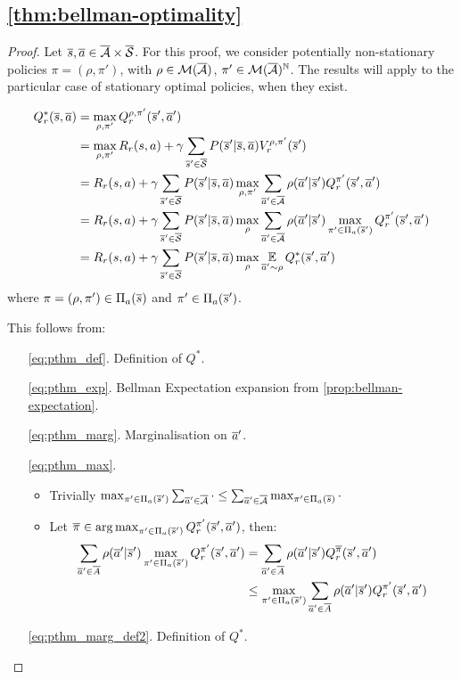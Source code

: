 \subsection{\autoref{thm:bellman-optimality}}

\begin{proof}
Let $\overline{s}, \overline{a} \in \overline{\mathcal{A}}\times\overline{\mathcal{S}}$. For this proof, we consider  potentially non-stationary policies $\pi=(\rho, \pi')$, with $\rho\in\mathcal{M}(\overline{\mathcal{A}})$, $\pi'\in\mathcal{M}(\overline{\mathcal{A}})^{\mathbb{N}}$. The results will apply to the particular case of stationary optimal policies, when they exist.

\begin{align}
    Q_r^*(\overline{s}, \overline{a}) &=  \max_{\rho, \pi'} Q_r^{\rho, \pi'}(\overline{s}', \overline{a}') \label{eq:pthm_def}\\
    &= \max_{\rho, \pi'} R_r(s, a) + \gamma \sum_{\overline{s}'\in\overline{\mathcal{S}}} P(\overline{s}' | \overline{s}, \overline{a}) V_r^{\rho, \pi'}(\overline{s}') \label{eq:pthm_exp}\\
    &= R_r(s, a) + \gamma \sum_{\overline{s}'\in\overline{\mathcal{S}}}  P(\overline{s}' | \overline{s}, \overline{a}) \max_{\rho, \pi'} \sum_{\overline{a}'\in\overline{\mathcal{A}}} \rho(\overline{a}' | \overline{s}')Q_r^{\pi'}(\overline{s}', \overline{a}') \label{eq:pthm_marg}\\
    &= R_r(s, a) + \gamma \sum_{\overline{s}'\in\overline{\mathcal{S}}}  P(\overline{s}' | \overline{s}, \overline{a}) \max_\rho\sum_{\overline{a}'\in\overline{\mathcal{A}}}\rho(\overline{a}' | \overline{s}')\max_{\pi'\in\Pi_a(\overline{s}')}Q_r^{\pi'}(\overline{s}', \overline{a}') \label{eq:pthm_max}\\
    &= R_r(s, a) + \gamma \sum_{\overline{s}'\in\overline{\mathcal{S}}}  P(\overline{s}' | \overline{s}, \overline{a}) \max_\rho\operatorname*{\mathbb{E}}\limits_{\overline{a}'\sim\rho}Q_r^*(\overline{s}', \overline{a}') \label{eq:pthm_marg_def2}
\end{align}
where $\pi = (\rho, \pi')\in\Pi_a(\overline{s})$ and $\pi'\in\Pi_a(\overline{s}')$.

This follows from:
\begin{enumerate}
\item[\eqref{eq:pthm_def}.] Definition of $Q^*$. 
\item[\eqref{eq:pthm_exp}.] Bellman Expectation expansion from \autoref{prop:bellman-expectation}.
\item[\eqref{eq:pthm_marg}.] Marginalisation on $\overline{a}'$.
\item[\eqref{eq:pthm_max}.] \begin{itemize}
    \item Trivially $\max_{\pi'\in\Pi_a(\overline{s}')} \sum_{\overline{a}'\in\overline{\mathcal{A}}} \cdot \leq \sum_{\overline{a}'\in\overline{\mathcal{A}}} \max_{ \pi'\in\Pi_a(\overline{s})} \cdot$
    \item Let $\overline{\pi}\in\operatorname*{arg\,max}_{\pi'\in\Pi_a(\overline{s}')} Q_r^{\pi'}(\overline{s}', \overline{a}')$, then:
    \begin{align*}
        \sum_{\overline{a}'\in\overline{A}}\rho(\overline{a}'|\overline{s}')\max_{\pi'\in\Pi_a(\overline{s}')}Q_r^{\pi'}(\overline{s}', \overline{a}') &= \sum_{\overline{a}'\in\overline{A}}\rho(\overline{a}'|\overline{s}')Q_r^{\overline{\pi}}(\overline{s}', \overline{a}') \\
        &\leq  \max_{\pi'\in\Pi_a(\overline{s}')} \sum_{\overline{a}'\in\overline{A}}\rho(\overline{a}'|\overline{s}')Q_r^{\pi'}(\overline{s}', \overline{a}')
    \end{align*}
\end{itemize}
\item[\eqref{eq:pthm_marg_def2}.] Definition of $Q^*$.
\end{enumerate}


\end{proof}
